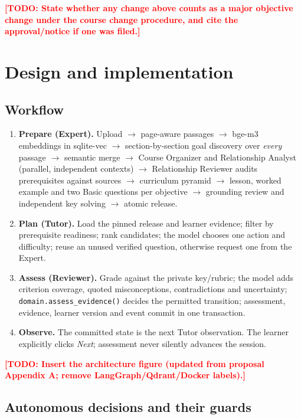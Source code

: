 \documentclass{article}
\newcommand{\todo}[1]{\textcolor{red}{\textbf{[TODO: #1]}}}
\newcommand{\code}[1]{\texttt{\small #1}}
\begin{document}
\todo{State whether any change above counts as a major objective change under the course change procedure, and cite the approval/notice if one was filed.}

\section{Design and implementation}

\subsection{Workflow}

\begin{enumerate}
\item \textbf{Prepare (Expert).} Upload $\rightarrow$ page-aware passages $\rightarrow$ bge-m3 embeddings in sqlite-vec $\rightarrow$ section-by-section goal discovery over \emph{every} passage $\rightarrow$ semantic merge $\rightarrow$ Course Organizer and Relationship Analyst (parallel, independent contexts) $\rightarrow$ Relationship Reviewer audits prerequisites against sources $\rightarrow$ curriculum pyramid $\rightarrow$ lesson, worked example and two Basic questions per objective $\rightarrow$ grounding review and independent key solving $\rightarrow$ atomic release.
\item \textbf{Plan (Tutor).} Load the pinned release and learner evidence; filter by prerequisite readiness; rank candidates; the model chooses one action and difficulty; reuse an unused verified question, otherwise request one from the Expert.
\item \textbf{Assess (Reviewer).} Grade against the private key/rubric; the model adds criterion coverage, quoted misconceptions, contradictions and uncertainty; \code{domain.assess\_evidence()} decides the permitted transition; assessment, evidence, learner version and event commit in one transaction.
\item \textbf{Observe.} The committed state is the next Tutor observation. The learner explicitly clicks \emph{Next}; assessment never silently advances the session.
\end{enumerate}

\todo{Insert the architecture figure (updated from proposal Appendix A; remove LangGraph/Qdrant/Docker labels).}

\subsection{Autonomous decisions and their guards}
\end{document}
